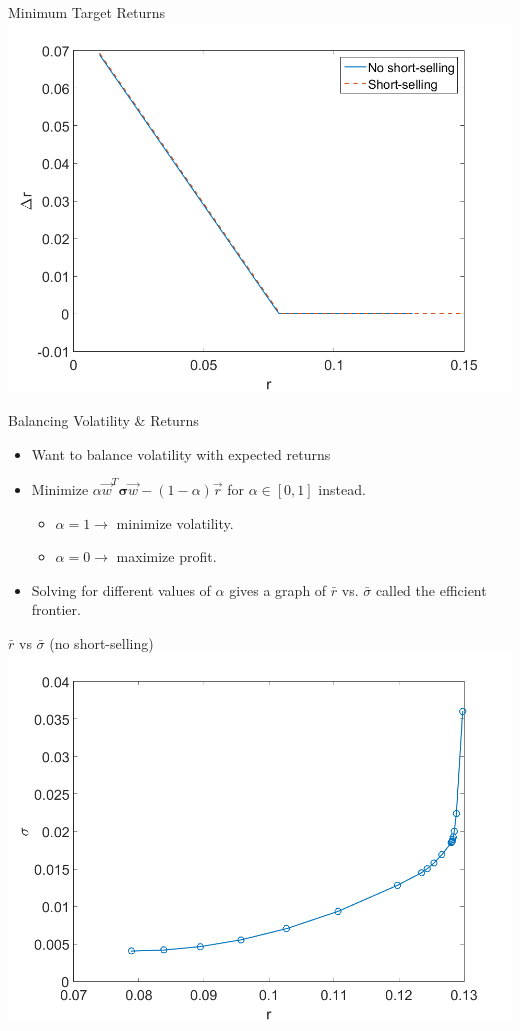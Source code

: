 \documentclass{beamer}
\numberwithin{equation}{section}
\begin{document}
\begin{frame}{Minimum Target Returns}
  \centering
  \includegraphics[width=1.0\textwidth]{../plots/delta_r}
\end{frame}

\begin{frame}{Balancing Volatility & Returns}
  \begin{itemize}
    \item{Want to balance volatility with expected returns}
    \item{Minimize $\alpha \vec w^T \boldsymbol{\sigma} \vec w - (1-\alpha)\vec r$ for $\alpha \in [0, 1]$ instead.}
    \begin{itemize}
      \item{$\alpha = 1 \to$ minimize volatility.}
      \item{$\alpha = 0 \to$ maximize profit.}
    \end{itemize}
    \item{Solving for different values of $\alpha$ gives a graph of $\bar r$ vs. $\bar \sigma$ called the efficient frontier.}
  \end{itemize}
\end{frame}

\begin{frame}{$\bar r$ vs $\bar \sigma$ (no short-selling)}
  \centering
  \includegraphics[width=1.0\textwidth]{../plots/r_sigma_alpha_no_ss}
\end{frame}
\end{document}
